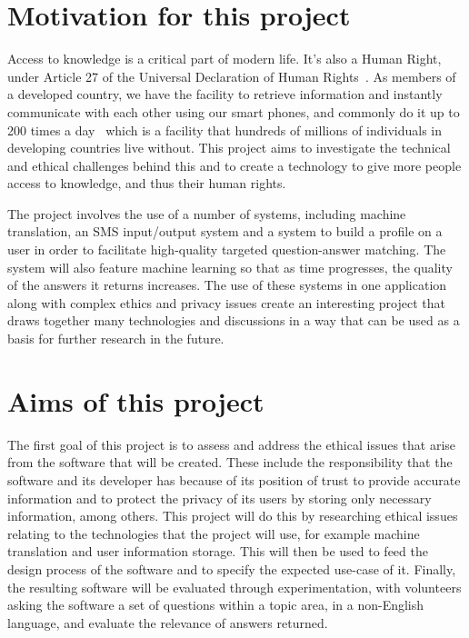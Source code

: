 \documentclass[authoryearcitations]{UoYCSproject}
\begin{document}
\section{Motivation for this project}
Access to knowledge is a critical part of modern life.  It's also a Human Right, under Article 27 of the Universal Declaration of Human Rights~\cite{community1948universal}.  As members of a developed country, we have the facility to retrieve information and instantly communicate with each other using our smart phones, and commonly do it up to 200 times a day~\cite{falaki} which is a facility that hundreds of millions of individuals in developing countries live without.  This project aims to investigate the technical and ethical challenges behind this and to create a technology to give more people access to knowledge, and thus their human rights.

The project involves the use of a number of systems, including machine translation, an SMS input/output system and a system to build a profile on a user in order to facilitate high-quality targeted question-answer matching.  The system will also feature machine learning so that as time progresses, the quality of the answers it returns increases.  The use of these systems in one application along with complex ethics and privacy issues create an interesting project that draws together many technologies and discussions in a way that can be used as a basis for further research in the future.

\section{Aims of this project}
\label{sec:introAimsOfThisProject}

The first goal of this project is to assess and address the ethical issues that arise from the software that will be created.  These include the responsibility that the software and its developer has because of its position of trust to provide accurate information and to protect the privacy of its users by storing only necessary information, among others.  This project will do this by researching ethical issues relating to the technologies that the project will use, for example machine translation and user information storage.  This will then be used to feed the design process of the software and to specify the expected use-case of it.  Finally, the resulting software will be evaluated through experimentation, with volunteers asking the software a set of questions within a topic area, in a non-English language, and evaluate the relevance of answers returned.
\end{document}
